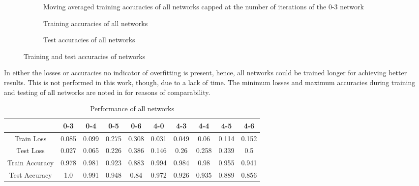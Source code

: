 \begin{figure}
	\setlength{}
	\setlength{}
	\centering
	\begin{subfigure}{\textwidth}
		\centering
		
		\caption{Moving averaged training accuracies of all networks capped at the number of iterations of the 0-3 network}
		\label{fig:train-accuracy-iteration}
	\end{subfigure}
	\begin{subfigure}{\textwidth}
		\centering
		
		\caption{Training accuracies of all networks}
		\label{fig:train-accuracy}
	\end{subfigure}
	\begin{subfigure}{\textwidth}
		\centering
		
		\caption{Test accuracies of all networks}
		\label{fig:test-accuracy}
	\end{subfigure}
	\caption{Training and test accuracies of networks}
	\label{fig:networks-accuracy}
\end{figure}
In either the losses or accuracies no indicator of overfitting is present, hence, all networks could be trained longer for achieving better results.
This is not performed in this work, though, due to a lack of time.
The minimum losses and maximum accuracies during training and testing of all networks are noted in  for reasons of comparability.
\begin{table}
	\centering
	\caption{Performance of all networks}
	\label{tab:network-performances}
	\begin{tabular}{c|c|c|c|c|c|c|c|c|c}
		& 0-3 & 0-4 & 0-5 & 0-6 & 4-0 & 4-3 & 4-4 & 4-5 & 4-6 \\ \hline
		Train Loss & 0.085 & 0.099 & 0.275 & 0.308 & 0.031 & 0.049 & 0.06 & 0.114 & 0.152 \\
		Test Loss & 0.027 & 0.065 & 0.226 & 0.386 & 0.146 & 0.26 & 0.258 & 0.339 & 0.5 \\ \hline
		Train Accuracy & 0.978 & 0.981 & 0.923 & 0.883 & 0.994 & 0.984 & 0.98 & 0.955 & 0.941 \\
		Test Accuracy & 1.0 & 0.991 & 0.948 & 0.84 & 0.972 & 0.926 & 0.935 & 0.889 & 0.856 \\
	\end{tabular}
\end{table}